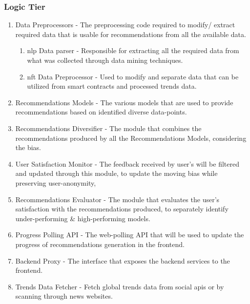 \subsubsection{Logic Tier}
\begin{enumerate}
    \item Data Preprocessors - The preprocessing code required to modify/ extract required data that is usable for recommendations from all the available data.
    \begin{enumerate}
        \item \gls{nlp} Data parser - Responsible for extracting all the required data from what was collected through data mining techniques.
        \item \gls{nft} Data Preprocessor - Used to modify and separate data that can be utilized from smart contracts and processed trends data.
    \end{enumerate}
    \item Recommendations Models - The various models that are used to provide recommendations based on identified diverse data-points.
    \item Recommendations Diversifier - The module that combines the recommendations produced by all the Recommendations Models, considering the bias.
    \item User Satisfaction Monitor - The feedback received by user's will be filtered and updated through this module, to update the moving bias while preserving user-anonymity,
    \item Recommendations Evaluator - The module that evaluates the user's satisfaction with the recommendations produced, to separately identify under-performing \& high-performing models.
    \item Progress Polling API - The web-polling API that will be used to update the progress of recommendations generation in the frontend.
    \item Backend Proxy - The interface that exposes the backend services to the frontend.
    \item Trends Data Fetcher - Fetch global trends data from social \gls{api}s or by scanning through news websites.
\end{enumerate}

